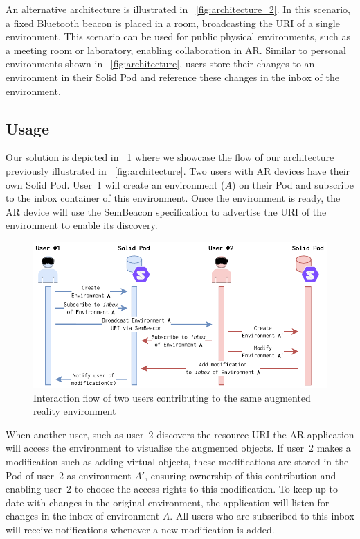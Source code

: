 An alternative architecture is illustrated in \figurename~\ref{fig:architecture_2}. In this scenario, a fixed Bluetooth beacon is placed in a room, broadcasting the URI of a single environment. This scenario can be used for public physical environments, such as a meeting room or laboratory, enabling collaboration in AR. Similar to personal environments shown in \figurename~\ref{fig:architecture}, users store their changes to an environment in their Solid Pod and reference these changes in the inbox of the environment.

\subsection{Usage}
Our solution is depicted in \figurename~\ref{fig:flow} where we showcase the flow of our architecture previously illustrated in \figurename~\ref{fig:architecture}. Two users with AR devices have their own Solid Pod. User~1 will create an environment ($A$) on their Pod and subscribe to the inbox container of this environment. Once the environment is ready, the AR device will use the SemBeacon specification to advertise the URI of the environment to enable its discovery.

\begin{figure}[htb]
\centering
\includegraphics[scale=0.90]{images/flow.pdf}
\caption{Interaction flow of two users contributing to the same augmented reality environment} \label{fig:flow}
\end{figure}

When another user, such as user~2 discovers the resource URI the AR application will access the environment to visualise the augmented objects. If user~2 makes a modification such as adding virtual objects, these modifications are stored in the Pod of user~2 as environment $A'$, ensuring ownership of this contribution and enabling user~2 to choose the access rights to this modification. To keep up-to-date with changes in the original environment, the application will listen for changes in the inbox of environment $A$. All users who are subscribed to this inbox will receive notifications whenever a new modification is added.


